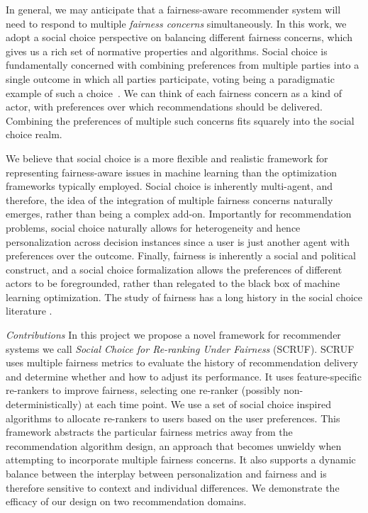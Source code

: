 In general, we may anticipate that a fairness-aware recommender system will need to respond to multiple \textit{fairness concerns} simultaneously. In this work, we adopt a social choice perspective \cite{BCELP16a} on balancing different fairness concerns, which gives us a rich set of normative properties and algorithms. Social choice is fundamentally concerned with combining preferences from multiple parties into a single outcome in which all parties participate, voting being a paradigmatic example of such a choice~\cite{Zwicker:Voting}. We can think of each fairness concern as a kind of actor, with preferences over which recommendations should be delivered. Combining the preferences of multiple such concerns fits squarely into the social choice realm.

We believe that social choice is a more flexible and realistic framework for representing fairness-aware issues in machine learning than the optimization frameworks typically employed. Social choice is inherently multi-agent, and therefore, the idea of the integration of multiple fairness concerns naturally emerges, rather than being a complex add-on. Importantly for recommendation problems, social choice naturally allows for heterogeneity and hence personalization across decision instances since a user is just another agent with preferences over the outcome. Finally, fairness is inherently a social and political construct, and a social choice formalization allows the preferences of different actors to be foregrounded, rather than relegated to the black box of machine learning optimization. The study of fairness has a long history in the social choice literature \cite{Young:Equity,Zwicker:Voting}.

\noindent\textit{Contributions} In this project we propose a novel framework for recommender systems we call \textit{Social Choice for Re-ranking Under Fairness} (SCRUF). SCRUF uses multiple fairness metrics to evaluate the history of recommendation delivery and determine whether and how to adjust its performance. It uses feature-specific re-rankers to improve fairness, selecting one re-ranker (possibly non-deterministically) at each time point. We use a set of social choice inspired algorithms to allocate re-rankers to users based on the user preferences. This framework abstracts the particular fairness metrics away from the recommendation algorithm design, an approach that becomes unwieldy when attempting to incorporate multiple fairness concerns. It also supports a dynamic balance between the interplay between personalization and fairness and is therefore sensitive to context and individual differences. We demonstrate the efficacy of our design on two recommendation domains.


